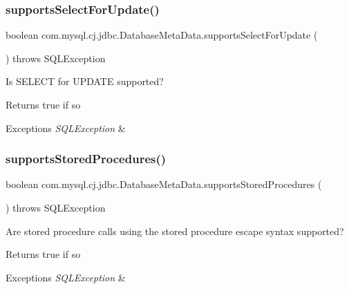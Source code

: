 \subsubsection{\texorpdfstring{supports\+Select\+For\+Update()}{supportsSelectForUpdate()}}
{\footnotesize\ttfamily boolean com.\+mysql.\+cj.\+jdbc.\+Database\+Meta\+Data.\+supports\+Select\+For\+Update (\begin{DoxyParamCaption}{ }\end{DoxyParamCaption}) throws S\+Q\+L\+Exception}

Is S\+E\+L\+E\+CT for U\+P\+D\+A\+TE supported?

\begin{DoxyReturn}{Returns}
true if so 
\end{DoxyReturn}

\begin{DoxyExceptions}{Exceptions}
{\em S\+Q\+L\+Exception} & \\
\hline
\end{DoxyExceptions}
\mbox{\label{classcom_1_1mysql_1_1cj_1_1jdbc_1_1_database_meta_data_ac02a41ca47262081bc15ef3374bf9efd}} 
\subsubsection{\texorpdfstring{supports\+Stored\+Procedures()}{supportsStoredProcedures()}}
{\footnotesize\ttfamily boolean com.\+mysql.\+cj.\+jdbc.\+Database\+Meta\+Data.\+supports\+Stored\+Procedures (\begin{DoxyParamCaption}{ }\end{DoxyParamCaption}) throws S\+Q\+L\+Exception}

Are stored procedure calls using the stored procedure escape syntax supported?

\begin{DoxyReturn}{Returns}
true if so 
\end{DoxyReturn}

\begin{DoxyExceptions}{Exceptions}
{\em S\+Q\+L\+Exception} & \\
\hline
\end{DoxyExceptions}
\mbox{\label{classcom_1_1mysql_1_1cj_1_1jdbc_1_1_database_meta_data_aac9a3076e88d2e778883e93cc5c0cdb4}} 
